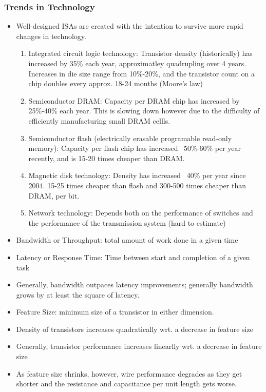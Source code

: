 \subsubsection{Trends in Technology}
\begin{itemize}
    \item Well-designed ISAs are created with the intention to survive more rapid changes in technology. 
    \begin{enumerate}
        \item Integrated circuit logic technology: Transistor density (historically) has increased by 35\% each year, approximatley quadrupling over 4 years. Increases in die size range from 10\%-20\%, and the transistor count on a chip doubles every approx. 18-24 months (Moore's law)
        \item Semiconductor DRAM: Capacity per DRAM chip has increased by 25\%-40\% each year. This is slowing down however due to the difficulty of efficiently manufacturing small DRAM cellls.
        \item Semiconductor flash (electrically erasable programable read-only memory): Capacity per flash chip has increased ~50\%-60\% per year recently, and is 15-20 times cheaper than DRAM.
        \item Magnetic disk technology: Density has increased ~40\% per year since 2004. 15-25 times cheaper than flash and 300-500 times cheaper than DRAM, per bit.
        \item Network technology: Depends both on the performance of switches and the performance of the transmission system (hard to estimate)
    \end{enumerate}
    \item Bandwidth or Throughput: total amount of work done in a given time
    \item Latency or Response Time: Time between start and completion of a given task
    \item Generally, bandwidth outpaces latency improvements; generally bandwidth grows by at least the square of latency.
    \item Feature Size: minimum size of a transistor in either dimension. 
    \item Density of transistors increases quadratically wrt. a decrease in feature size
    \item Generally, transistor performance increases linearlly wrt. a decrease in feature size
    \item As feature size shrinks, however, wire performance degrades as they get shorter and the resistance and capacitance per unit length gets worse.
\end{itemize}
